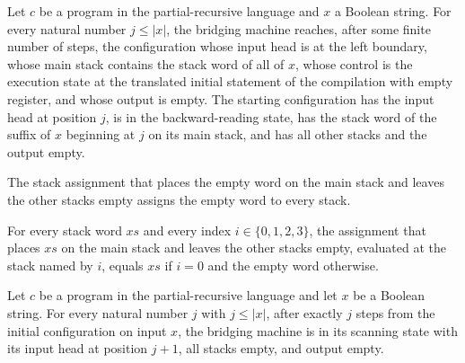 \begin{lemma}
\label{Turing.bridge_back}
\leanok
{}
Let $c$ be a program in the partial-recursive language and $x$ a Boolean string. For
every natural number $j\le |x|$, the bridging machine reaches, after some finite number
of steps, the configuration whose input head is at the left boundary, whose main stack
contains the stack word of all of $x$, whose control is the execution state at the
translated initial statement of the compilation with empty register, and whose output is
empty. The starting configuration has the input head at position $j$, is in the
backward-reading state, has the stack word of the suffix of $x$ beginning at $j$ on its
main stack, and has all other stacks and the output empty.
\end{lemma}

\begin{lemma}
\label{Turing.bridgeStore_nil}
\leanok
{}
The stack assignment that places the empty word on the main stack and leaves the other
stacks empty assigns the empty word to every stack.
\end{lemma}

\begin{lemma}
\label{Turing.bridgeStore_at}
\leanok
{}
For every stack word $xs$ and every index $i\in\{0,1,2,3\}$, the assignment that places
$xs$ on the main stack and leaves the other stacks empty, evaluated at the stack named
by $i$, equals $xs$ if $i=0$ and the empty word otherwise.
\end{lemma}

\begin{lemma}
\label{Turing.bridge_scan}
\leanok
{}
Let $c$ be a program in the partial-recursive language and let $x$ be a Boolean string.
For every natural number $j$ with $j\leq |x|$, after exactly $j$ steps from the initial
configuration on input $x$, the bridging machine is in its scanning state with its input
head at position $j+1$, all stacks empty, and output empty.
\end{lemma}

